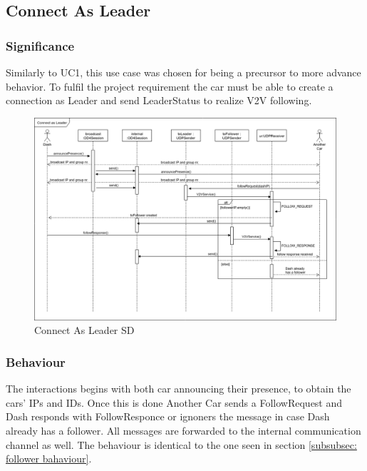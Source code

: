 \documentclass[12pt]{article}
\begin{document}
\subsection{Connect As Leader}
\subsubsection{Significance}
Similarly to UC1, this use case was chosen for being a precursor to more advance behavior. To fulfil the project requirement the car must be able to create a connection as Leader and send LeaderStatus to realize V2V following.\par
\FloatBarrier %
\begin{figure}[ht!]
\centering
\includegraphics[width=\linewidth]{Diagrams/ConnectAsLeader.png}
\caption{Connect As Leader SD}
\label{fig:stopfollowing}
\end{figure}
\FloatBarrier %

\subsubsection{Behaviour}
The interactions begins with both car announcing their presence, to obtain the cars' IPs and IDs. Once this is done Another Car sends a FollowRequest and Dash responds with FollowResponce or ignoners the message in case Dash already has a follower. All messages are forwarded to the internal communication channel as well. The behaviour is identical to the one seen in section \ref{subsubsec: follower bahaviour}. \par
\end{document}
